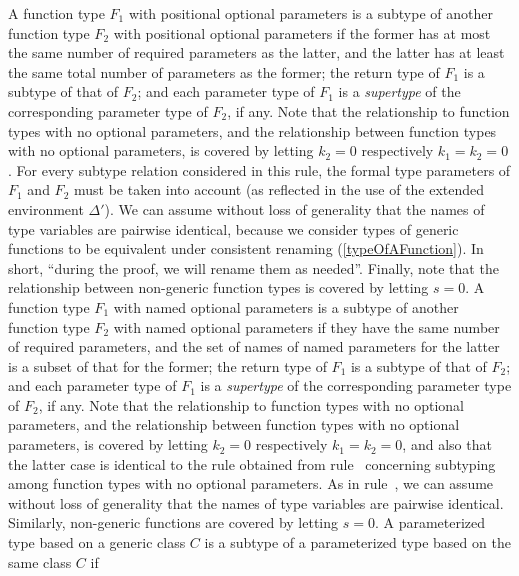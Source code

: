 \documentclass[makeidx]{article}
\begin{document}
{{\begin{itemize}
  A function type $F_1$ with positional optional parameters
  is a subtype of
  another function type $F_2$ with positional optional parameters
  if the former has at most
  the same number of required parameters as the latter,
  and the latter has at least
  the same total number of parameters as the former;
  the return type of $F_1$ is a subtype of that of $F_2$;
  and each parameter type of $F_1$ is a \emph{supertype} of
  the corresponding parameter type of $F_2$, if any.
  Note that the relationship to function types with no optional parameters,
  and the relationship between function types with no optional parameters,
  is covered by letting $k_2 = 0$ respectively $k_1 = k_2 = 0$.
  For every subtype relation considered in this rule,
  the formal type parameters of $F_1$ and $F_2$ must be taken into account
  (as reflected in the use of the extended environment $\Delta'$).
  We can assume without loss of generality
  that the names of type variables are pairwise identical,
  because we consider types of generic functions to be equivalent under
  consistent renaming
  (\ref{typeOfAFunction}).
  In short, ``during the proof, we will rename them as needed''.
  Finally, note that the relationship between non-generic function types
  is covered by letting $s = 0$.
  A function type $F_1$ with named optional parameters is a subtype of
  another function type $F_2$ with named optional parameters
  if they have the same number of required parameters,
  and the set of names of named parameters for the latter is a subset
  of that for the former;
  the return type of $F_1$ is a subtype of that of $F_2$;
  and each parameter type of $F_1$ is a \emph{supertype} of
  the corresponding parameter type of $F_2$, if any.
  Note that the relationship to function types with no optional parameters,
  and the relationship between function types with no optional parameters,
  is covered by letting $k_2 = 0$ respectively $k_1 = k_2 = 0$,
  and also that the latter case is identical to the rule obtained from
  rule~\SrnPositionalFunctionType{}
  concerning subtyping among function types with no optional parameters.
  As in rule~\SrnPositionalFunctionType,
  we can assume without loss of generality
  that the names of type variables are pairwise identical.
  Similarly, non-generic functions are covered by letting $s = 0$.
  A parameterized type based on a generic class $C$ is a subtype of
  a parameterized type based on the same class $C$ if

\end{itemize}}}
\end{document}
